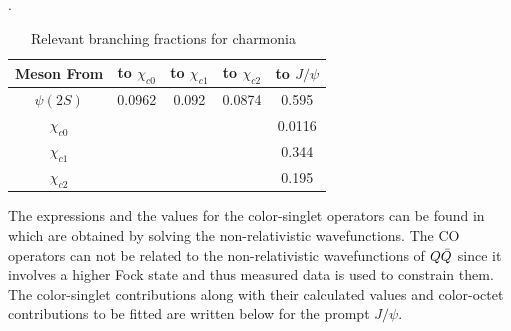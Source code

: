 \documentclass[aps,prc,preprint,superscriptaddress,showpacs,showkeys,amsmath]{revtex4-1}
\begin{document}
\begin{table}[h]
\caption{Relevant branching fractions for charmonia~\cite{Nakamura:2010zzi}}.
\begin{tabular}{c|cccc}
Meson From &to $\chi_{c0}$ &to $\chi_{c1}$ &to $\chi_{c2}$ &to $J/\psi$\\ 
\hline
$\psi(2S)$& 0.0962 & 0.092 & 0.0874 & 0.595   \\
$\chi_{c0}$& &  &  & 0.0116           \\
$\chi_{c1}$& &  &  & 0.344           \\
$\chi_{c2}$& &  &  & 0.195           \\
\hline
\end{tabular}
\label{table:CharmoniaBFs}
\end{table}

  The expressions and the values for the color-singlet operators can be found 
in~\cite{Cho:1995ce,Cho:1995vh,Eichten:1994gt} which are obtained by solving the 
non-relativistic wavefunctions.
 The CO operators can not be related to the non-relativistic
wavefunctions of $Q{\bar{Q}}$ since it involves a higher Fock state and thus
measured data is used to constrain them.
  The color-singlet contributions along with their calculated values 
and color-octet contributions to be fitted are written below for the prompt
$J/\psi$.
\end{document}
